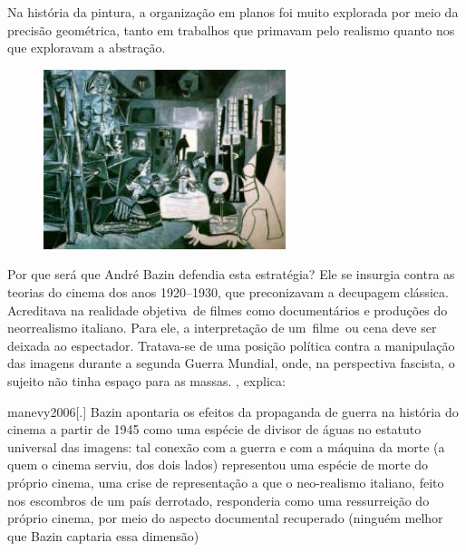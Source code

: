 Na história da pintura, a organização em planos foi muito explorada por
meio da precisão geométrica, tanto em trabalhos que primavam pelo
realismo quanto nos que exploravam a abstração.

\begin{figure}
  \flushright
  \begin{minipage}{.6\linewidth}
	\caption{}
	\includegraphics[width=\linewidth]{figuras/picasso-las-meninas-1957.pdf.compressed.pdf}
  \end{minipage}
\end{figure}

Por que será que André Bazin defendia esta estratégia? Ele se insurgia
contra as teorias do cinema dos anos 1920--1930, que preconizavam a decupagem
clássica. Acreditava na realidade objetiva~de filmes como documentários
e produções do neorrealismo italiano. Para ele, a interpretação de 
um~filme~ou cena deve ser deixada ao espectador. Tratava-se de uma posição
política contra a manipulação das imagens durante a segunda Guerra
Mundial, onde, na perspectiva fascista, o sujeito não tinha espaço para
as massas. \textcite{manevy2006}, explica:

\begin{displaycquote}[233]{manevy2006}[.]
	Bazin apontaria os efeitos da propaganda de guerra na história do cinema
	a partir de 1945 como uma espécie de divisor de águas no estatuto
	universal das imagens: tal conexão com a guerra e com a máquina da morte
	(a quem o cinema serviu, dos dois lados) representou uma espécie de
	morte do próprio cinema, uma crise de representação a que o neo-realismo
	italiano, feito nos escombros de um país derrotado, responderia como uma
	ressurreição do próprio cinema, por meio do aspecto documental
	recuperado (ninguém melhor que Bazin captaria essa dimensão)
\end{displaycquote}

